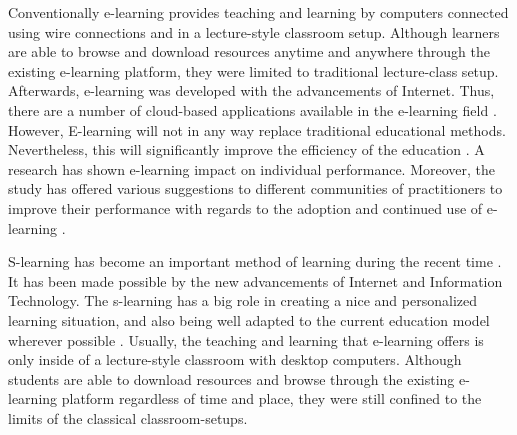 \documentclass[journal]{vgtc}
\begin{document}
Conventionally e-learning provides teaching and learning by computers connected using wire connections and in a lecture-style classroom setup. Although learners are able to browse and download resources anytime and anywhere through the existing e-learning platform, they were limited to traditional lecture-class setup. Afterwards, e-learning was developed with the advancements of Internet. Thus, there are a number of cloud-based applications available in the e-learning field \cite{s110807835}. However, E-learning will not in any way replace traditional educational methods. Nevertheless, this will significantly improve the efficiency of the education \cite{SudhirKumarSharmaNidhiGoyal2014}. A research has shown e-learning impact on individual performance. Moreover, the study has offered various suggestions to different communities of practitioners to improve their performance with regards to the adoption and continued use of e-learning \cite{Mohammadyari2014}.

S-learning has become an important method of learning during the recent time \cite{Kim2013}. It has been made possible by the new advancements of Internet and Information Technology. The s-learning has a big role in creating a nice and personalized learning situation, and also being well adapted to the current education model wherever possible \cite{Uden2007}. Usually, the teaching and learning that e-learning offers is only inside of a lecture-style classroom with desktop computers. Although students are able to download resources and browse through the existing e-learning platform regardless of time and place, they were still confined to the limits of the classical classroom-setups.

\end{document}
